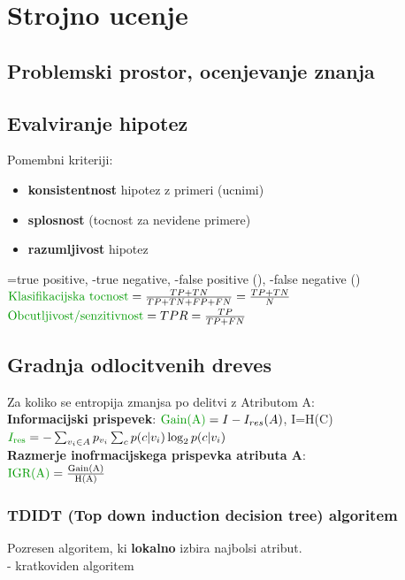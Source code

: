 \section{Strojno ucenje}


\subsection{Problemski prostor, ocenjevanje znanja}

\subsection{Evalviranje hipotez}
Pomembni kriteriji:
\begin{itemize}[leftmargin=*,labelindent=0pt,labelwidth=0pt,itemsep=0pt,parsep=0pt,topsep=0pt]
    \item \textbf{konsistentnost} hipotez z primeri (ucnimi)
    \item \textbf{splosnost} (tocnost za nevidene primere)
    \item \textbf{razumljivost} hipotez
\end{itemize}
=true positive, -true negative, -false positive (), -false negative () \\
$\text{\green{Klasifikacijska tocnost}}=\frac{TP+TN}{TP+TN+FP+FN}=\frac{TP+TN}{N}$\\
$\text{\green{Obcutljivost/senzitivnost}}=TPR=\frac{TP}{TP+FN}$

\subsection{Gradnja odlocitvenih dreves}
Za koliko se entropija zmanjsa po delitvi z Atributom A:\\
\textbf{Informacijski prispevek}: $\text{\green{Gain(A)}}=I-I_{res}(A)$, I=H(C)\\
$\green{I_{\text{res}}}=-\sum_{v_i\in A}p_{v_i}\sum_c p(c|v_i)\log_2p(c|v_i)$\\
\textbf{Razmerje inofrmacijskega prispevka atributa A}:\\ 
$\text{\green{IGR(A)}}=\frac{\text{Gain(A)}}{\text{H(A)}}$


\subsubsection{TDIDT (Top down induction decision tree) algoritem}
Pozresen algoritem, ki \textbf{lokalno} izbira najbolsi atribut.\\
- kratkoviden algoritem

